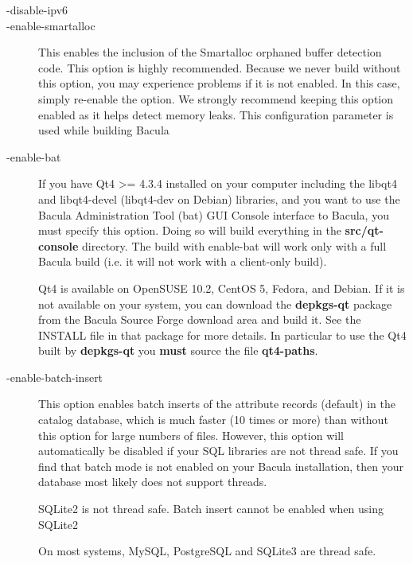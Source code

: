\begin{description}
\item [ {-}{\-}disable-ipv6 ]

\item [ {-}{\-}enable-smartalloc ]
   This enables the inclusion of the Smartalloc orphaned buffer detection
   code.  This option is highly recommended.  Because we never build
   without this option, you may experience problems if it is not enabled.
   In this case, simply re-enable the option.  We strongly recommend
   keeping this option enabled as it helps detect memory leaks.  This
   configuration parameter is used while building Bacula

\item [ {-}{\-}enable-bat ]
   \label{enablebat}
   If you have Qt4 >= 4.3.4 installed on your computer including the
   libqt4 and libqt4-devel (libqt4-dev on Debian) libraries, and you want
   to use the Bacula Administration Tool (bat) GUI Console interface to
   Bacula, you must specify this option.  Doing so will build everything in
   the {\bf src/qt-console} directory.  The build with enable-bat will work
   only with a full Bacula build (i.e. it will not work with a client-only
   build). 

   Qt4 is available on OpenSUSE 10.2, CentOS 5, Fedora, and Debian. If it
   is not available on your system, you can download the {\bf depkgs-qt}
   package from the Bacula Source Forge download area and build it.
   See the
   INSTALL file in that package for more details. In particular to use
   the Qt4 built by {\bf depkgs-qt} you {\bf must} source the file
   {\bf qt4-paths}.

\item [ {-}{\-}enable-batch-insert ]
   This option enables batch inserts of the attribute records (default) in
    the catalog database, which is much faster (10 times or more) than
   without this option for large numbers of files. However, this option
   will automatically be disabled if your SQL libraries are not
   thread safe. If you find that batch mode is not enabled on your Bacula
   installation, then your database most likely does not support threads.

   SQLite2 is not thread safe.  Batch insert cannot be enabled when using
   SQLite2

   On most systems, MySQL, PostgreSQL and SQLite3 are thread safe.


\end{description}
